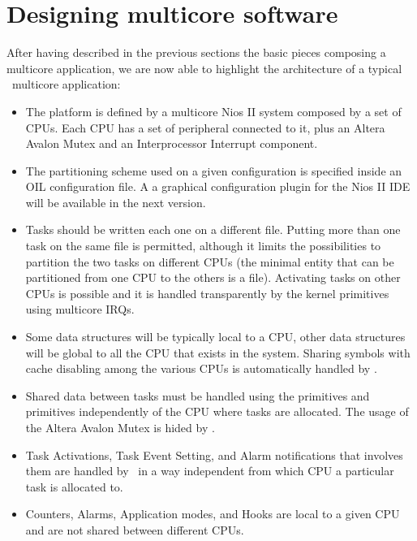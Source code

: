 \section{Designing multicore software}

After having described in the previous sections the basic pieces
composing a multicore application, we are now able to highlight the
architecture of a typical \ee\ multicore application:

\begin{itemize}
\item The platform is defined by a multicore Nios II system composed
  by a set of CPUs. Each CPU has a set of peripheral connected to it,
  plus an Altera Avalon Mutex and an Interprocessor Interrupt
  component.


\item The partitioning scheme used on a given configuration is
  specified inside an OIL configuration file. A a graphical
  configuration plugin for the Nios II IDE will be available in the
  next version.


\item Tasks should be written each one on a different file. Putting
  more than one task on the same file is permitted, although it limits
  the possibilities to partition the two tasks on different CPUs (the
  minimal entity that can be partitioned from one CPU to the others is
  a file). Activating tasks on other CPUs is possible and it is
  handled transparently by the kernel primitives using multicore IRQs.


\item Some data structures will be typically local to a CPU, other
  data structures will be global to all the CPU that exists in the
  system.  Sharing symbols with cache disabling among the various CPUs
  is automatically handled by \ee.


\item Shared data between tasks must be handled using the primitives
   and  primitives
  independently of the CPU where tasks are allocated. The usage of the
  Altera Avalon Mutex is hided by \ee.


\item Task Activations, Task Event Setting, and Alarm notifications
  that involves them are handled by \ee\ in a way independent from
  which CPU a particular task is allocated to.


\item Counters, Alarms, Application modes, and Hooks are local to a
  given CPU and are not shared between different CPUs.



\end{itemize}
